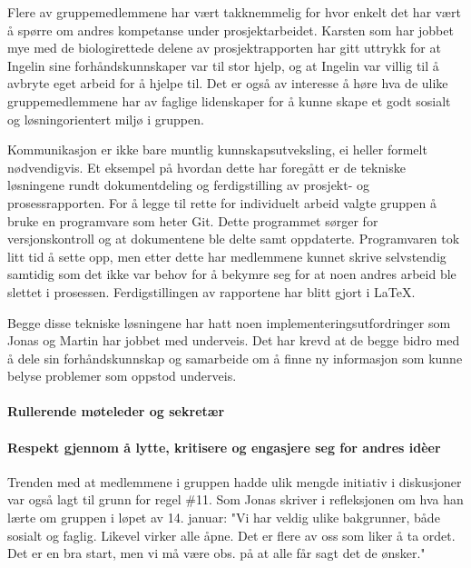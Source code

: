 Flere av gruppemedlemmene har vært takknemmelig for hvor enkelt det har vært å spørre om andres kompetanse under prosjektarbeidet.
Karsten som har jobbet mye med de biologirettede delene av prosjektrapporten har gitt uttrykk for at Ingelin sine forhåndskunnskaper var til stor hjelp, og at Ingelin var villig til å avbryte eget arbeid for å hjelpe til.
Det er også av interesse å høre hva de ulike gruppemedlemmene har av faglige lidenskaper for å kunne skape et godt sosialt og løsningorientert miljø i gruppen.

Kommunikasjon er ikke bare muntlig kunnskapsutveksling, ei heller formelt nødvendigvis.
Et eksempel på hvordan dette har foregått er de tekniske løsningene rundt dokumentdeling og ferdigstilling av prosjekt- og prosessrapporten.
For å legge til rette for individuelt arbeid valgte gruppen å bruke en programvare som heter Git.
Dette programmet sørger for versjonskontroll og at dokumentene ble delte samt oppdaterte.
Programvaren tok litt tid å sette opp, men etter dette har medlemmene kunnet skrive selvstendig samtidig som det ikke var behov for å bekymre seg for at noen andres arbeid ble slettet i prosessen.
Ferdigstillingen av rapportene har blitt gjort i \LaTeX.

Begge disse tekniske løsningene har hatt noen implementeringsutfordringer som Jonas og Martin har jobbet med underveis.
Det har krevd at de begge bidro med å dele sin forhåndskunnskap og samarbeide om å finne ny informasjon som kunne belyse problemer som oppstod underveis.

\paragraph{Rullerende møteleder og sekretær}

\paragraph{Respekt gjennom å lytte, kritisere og engasjere seg for andres id\`{e}er}
Trenden med at medlemmene i gruppen hadde ulik mengde initiativ i diskusjoner var også lagt til grunn for regel \#11.
Som Jonas skriver i refleksjonen om hva han lærte om gruppen i løpet av 14. januar:
"Vi har veldig ulike bakgrunner, både sosialt og faglig. Likevel virker alle åpne. Det er flere av oss som liker å ta ordet. Det er en bra start, men vi må være obs. på at alle får sagt det de ønsker."

















